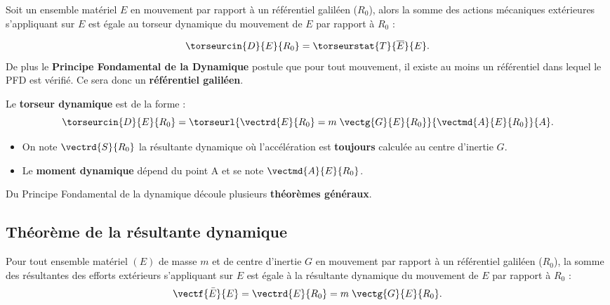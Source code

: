 \begin{defi}
Soit un ensemble matériel $E$ en mouvement par rapport à un référentiel galiléen ($R_0$), alors la somme des actions mécaniques extérieures s'appliquant sur $E$ est égale au torseur dynamique du mouvement de $E$ par rapport à $R_0$ :

$$
\torseurcin{D}{E}{R_0}=\torseurstat{T}{\overline{E}}{E}.
$$
De plus le \textbf{Principe Fondamental de la Dynamique} postule que pour tout mouvement, il existe au moins un référentiel dans lequel le PFD est vérifié. Ce sera donc un \textbf{référentiel galiléen}.


Le \textbf{torseur dynamique} est de la forme : 
$$
\torseurcin{D}{E}{R_0}=\torseurl{
\vectrd{E}{R_0}=m\;\vectg{G}{E}{R_0}
}{
\vectmd{A}{E}{R_0}
}{A}.
$$


\begin{itemize}
\item On note $\vectrd{S}{R_0}$ la résultante dynamique où l'accélération est \textbf{toujours} calculée au centre d'inertie $G$.
\item Le \textbf{moment dynamique} dépend du point A et se note $\vectmd{A}{E}{R_0}$.
\end{itemize}


%



\end{defi}


Du Principe Fondamental de la dynamique découle plusieurs \textbf{théorèmes généraux}.

\subsection{Théorème de la résultante dynamique}

\begin{theoreme}
Pour tout ensemble matériel $(E)$ de masse $m$ et de centre d'inertie $G$ en mouvement par rapport à un référentiel galiléen ($R_0$), la somme des résultantes des efforts extérieurs s'appliquant sur $E$ est égale à la résultante dynamique du mouvement de $E$ par rapport à $R_0$ :
$$
\vectf{\bar E}{E}=\vectrd{E}{R_0}=m\;\vectg{G}{E}{R_0}.
$$
\end{theoreme}


